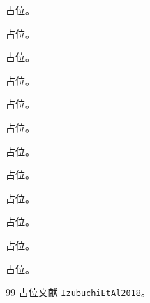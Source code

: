\begin{table}[h]\centering\caption{占位}\label{tab:summary-master}\end{table}
\begin{theorem}[占位]\label{thm:dis-ope}占位。\end{theorem}
\begin{theorem}[占位]\label{thm:heavy-bdpi}占位。\end{theorem}
\begin{theorem}[占位]\label{thm:lamet-coordinate}占位。\end{theorem}
\begin{theorem}[占位]\label{thm:lamet-hadronic}占位。\end{theorem}
\begin{theorem}[占位]\label{thm:lamet-parton-momentum}占位。\end{theorem}
\begin{theorem}[占位]\label{thm:lattice-lamet}占位。\end{theorem}
\begin{theorem}[占位]\label{thm:pdf-dglap}占位。\end{theorem}
\begin{theorem}[占位]\label{thm:pdf-moments-local}占位。\end{theorem}
\begin{theorem}[占位]\label{thm:yzliu-analyticity}占位。\end{theorem}
\begin{theorem}[占位]\label{thm:yzliu-soft-hqet}占位。\end{theorem}
\begin{theorem}[占位]\label{thm:yzliu-threshold}占位。\end{theorem}
\begin{theorem}[占位]\label{thm:yzliu-time-ordering}占位。\end{theorem}
\begin{thebibliography}{99}
 占位文献 \texttt{IzubuchiEtAl2018}。
\end{thebibliography}

